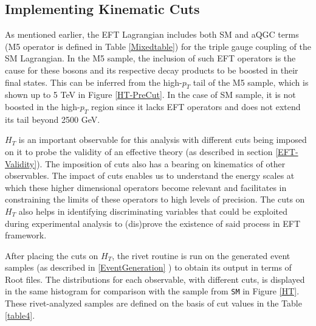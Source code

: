 \subsection{Implementing Kinematic Cuts}\label{Implementing Cuts}

As mentioned earlier, the EFT Lagrangian includes both SM and aQGC terms (M5 operator is defined in Table \ref{Mixedtable}) for the triple gauge coupling of the SM Lagrangian. In the M5 sample, the inclusion of such EFT operators is the cause for these bosons and its respective decay products to be boosted in their final states. This can be inferred from the high-$p_{T}$ tail of the M5 sample, which is shown up to 5 TeV in Figure \ref{HT-PreCut}. In the case of SM sample, it is not boosted in the high-$p_{T}$ region since it lacks EFT operators and does not extend its tail beyond 2500 GeV.

$H_{T}$ is an important observable for this analysis with different cuts being imposed on it to probe the validity of an effective theory (as described in section \ref{EFT-Validity}). The imposition of cuts also has a bearing on kinematics of other observables. The impact of cuts enables us to understand the energy scales at which these higher dimensional operators become relevant and facilitates in constraining the limits of these operators to high levels of precision. The cuts on $H_{T}$ also helps in identifying discriminating variables that could be exploited during experimental analysis to (dis)prove the existence of said process in EFT framework.

After placing the cuts on $H_{T}$, the rivet routine is run on the generated event samples (as described in \ref{EventGeneration} ) to obtain its output in terms of Root \cite{ROOT} files. The distributions for each observable, with different cuts, is displayed in the same histogram for comparison with the sample from \texttt{SM} in Figure \ref{HT}. These rivet-analyzed samples are defined on the basis of cut values in the Table \ref{table4}. 

